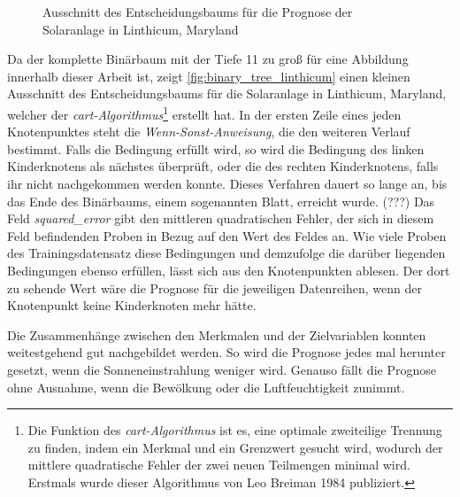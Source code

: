 \documentclass[12pt, a4paper]{article}
\begin{document}
\begin{figure}
\centering
\def\svgwidth{425pt}

\caption{Ausschnitt des Entscheidungsbaums für die Prognose der Solaranlage in Linthicum, Maryland}
\label{fig:binary_tree_linthicum}
\end {figure}

Da der komplette Binärbaum mit der Tiefe 11 zu groß für eine Abbildung innerhalb dieser Arbeit ist, zeigt \autoref{fig:binary_tree_linthicum} einen kleinen Ausschnitt des Entscheidungsbaums für die Solaranlage in Linthicum, Maryland, welcher der \textit{\ac{cart}-Algorithmus}\footnote{Die Funktion des \textit{\ac{cart}-Algorithmus} ist es, eine optimale zweiteilige Trennung zu finden, indem ein Merkmal und ein Grenzwert gesucht wird, wodurch der mittlere quadratische Fehler der zwei neuen Teilmengen minimal wird. Erstmals wurde dieser Algorithmus von Leo Breiman 1984 publiziert.} erstellt hat. In der ersten Zeile eines jeden Knotenpunktes steht die \textit{Wenn-Sonst-Anweisung}, die den weiteren Verlauf bestimmt. Falls die Bedingung erfüllt wird, so wird die Bedingung des linken Kinderknotens als nächstes überprüft, oder die des rechten Kinderknotens, falls ihr nicht nachgekommen werden konnte. Dieses Verfahren dauert so lange an, bis das Ende des Binärbaums, einem sogenannten Blatt, erreicht wurde.
(???)
Das Feld \textit{squared\_error} gibt den mittleren quadratischen Fehler, der sich in diesem Feld befindenden Proben in Bezug auf den Wert des Feldes an. Wie viele Proben des Trainingsdatensatz diese Bedingungen und demzufolge die darüber liegenden Bedingungen ebenso erfüllen, lässt sich aus den Knotenpunkten ablesen. Der dort zu sehende Wert wäre die Prognose für die jeweiligen Datenreihen, wenn der Knotenpunkt keine Kinderknoten mehr hätte.

Die Zusammenhänge zwischen den Merkmalen und der Zielvariablen konnten weitestgehend gut nachgebildet werden. So wird die Prognose jedes mal herunter gesetzt, wenn die Sonneneinstrahlung weniger wird. Genauso fällt die Prognose ohne Ausnahme, wenn die Bewölkung oder die Luftfeuchtigkeit zunimmt. 
\end{document}
